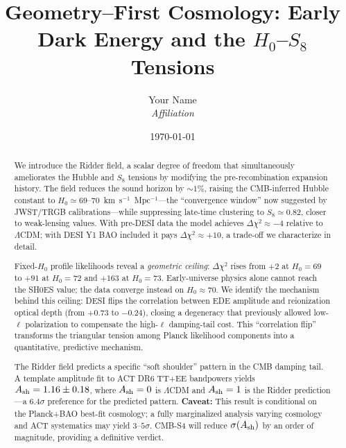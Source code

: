 \documentclass[a4paper,11pt]{article}
\title{Geometry--First Cosmology: Early Dark Energy and the $H_0$--$S_8$ Tensions}
\author{Your Name \\ \textit{Affiliation}}
\date{\today}
\begin{document}
\maketitle

\begin{abstract}
We introduce the Ridder field, a scalar degree of freedom that simultaneously ameliorates the Hubble and $S_8$ tensions by modifying the pre-recombination expansion history. The field reduces the sound horizon by $\sim 1\%$, raising the CMB-inferred Hubble constant to $H_0 \simeq 69$--$70$~km~s$^{-1}$~Mpc$^{-1}$---the ``convergence window'' now suggested by JWST/TRGB calibrations---while suppressing late-time clustering to $S_8 \simeq 0.82$, closer to weak-lensing values. With pre-DESI data the model achieves $\Delta\chi^2 \approx -4$ relative to $\Lambda$CDM; with DESI Y1 BAO included it pays $\Delta\chi^2 \approx +10$, a trade-off we characterize in detail.

Fixed-$H_0$ profile likelihoods reveal a \emph{geometric ceiling}: $\Delta\chi^2$ rises from $+2$ at $H_0 = 69$ to $+91$ at $H_0 = 72$ and $+163$ at $H_0 = 73$. Early-universe physics alone cannot reach the SH0ES value; the data converge instead on $H_0 \approx 70$. We identify the mechanism behind this ceiling: DESI flips the correlation between EDE amplitude and reionization optical depth (from $+0.73$ to $-0.24$), closing a degeneracy that previously allowed low-$\ell$ polarization to compensate the high-$\ell$ damping-tail cost. This ``correlation flip'' transforms the triangular tension among Planck likelihood components into a quantitative, predictive mechanism.

The Ridder field predicts a specific ``soft shoulder'' pattern in the CMB damping tail. A template amplitude fit to ACT DR6 TT+EE bandpowers yields $A_{\rm sh} = 1.16 \pm 0.18$, where $A_{\rm sh} = 0$ is $\Lambda$CDM and $A_{\rm sh} = 1$ is the Ridder prediction---a $6.4\sigma$ preference for the predicted pattern. \textbf{Caveat:} This result is conditional on the Planck+BAO best-fit cosmology; a fully marginalized analysis varying cosmology and ACT systematics may yield $3$--$5\sigma$. CMB-S4 will reduce $\sigma(A_{\rm sh})$ by an order of magnitude, providing a definitive verdict.
\end{abstract}

\end{document}
